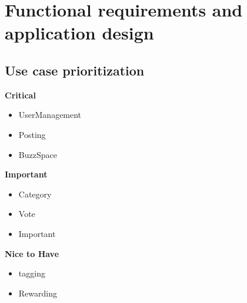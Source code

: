 \documentclass[a4paper,12pt]{report}
\begin{document}
\newpage
\section{Functional requirements and application design}

\subsection{Use case prioritization}

\textbf{Critical}
\begin{itemize}
	\item UserManagement
	\item Posting
	\item BuzzSpace
\end{itemize}

\textbf{Important}
\begin{itemize}
	\item Category
	\item Vote
	\item Important
\end{itemize}

\textbf{Nice to Have}
\begin{itemize}
	\item tagging
	\item Rewarding
\end{itemize}
\end{document}
